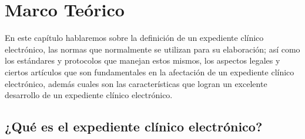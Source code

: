 \chapter{Marco Teórico}
En este capítulo hablaremos sobre la definición de un expediente clínico electrónico, las normas que normalmente se utilizan para su elaboración; así como los estándares y protocolos que manejan estos mismos, los aspectos legales y ciertos artículos que son fundamentales en la afectación de un expediente clínico electrónico, además cuales son las características que logran un excelente desarrollo de un expediente clínico electrónico.

\section{¿Qué es el expediente clínico electrónico?}

